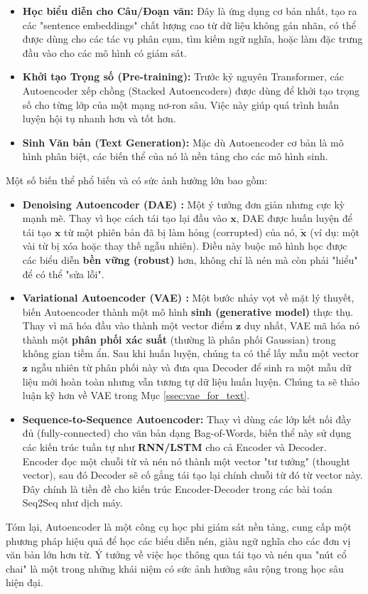\begin{itemize}
    \item \textbf{Học biểu diễn cho Câu/Đoạn văn:} Đây là ứng dụng cơ bản nhất, tạo ra các "sentence embeddings" chất lượng cao từ dữ liệu không gán nhãn, có thể được dùng cho các tác vụ phân cụm, tìm kiếm ngữ nghĩa, hoặc làm đặc trưng đầu vào cho các mô hình có giám sát.
    \item \textbf{Khởi tạo Trọng số (Pre-training):} Trước kỷ nguyên Transformer, các Autoencoder xếp chồng (Stacked Autoencoders) được dùng để khởi tạo trọng số cho từng lớp của một mạng nơ-ron sâu. Việc này giúp quá trình huấn luyện hội tụ nhanh hơn và tốt hơn.
    \item \textbf{Sinh Văn bản (Text Generation):} Mặc dù Autoencoder cơ bản là mô hình phân biệt, các biến thể của nó là nền tảng cho các mô hình sinh.
\end{itemize}

Một số biến thể phổ biến và có sức ảnh hưởng lớn bao gồm:

\begin{itemize}
    \item \textbf{Denoising Autoencoder (DAE) \cite{vincent2008extracting}:} Một ý tưởng đơn giản nhưng cực kỳ mạnh mẽ. Thay vì học cách tái tạo lại đầu vào $\mathbf{x}$, DAE được huấn luyện để tái tạo $\mathbf{x}$ từ một phiên bản đã bị làm hỏng (corrupted) của nó, $\tilde{\mathbf{x}}$ (ví dụ: một vài từ bị xóa hoặc thay thế ngẫu nhiên). Điều này buộc mô hình học được các biểu diễn \textbf{bền vững (robust)} hơn, không chỉ là nén mà còn phải "hiểu" để có thể "sửa lỗi".
    \item \textbf{Variational Autoencoder (VAE) \cite{kingma2013auto}:} Một bước nhảy vọt về mặt lý thuyết, biến Autoencoder thành một mô hình \textbf{sinh (generative model)} thực thụ. Thay vì mã hóa đầu vào thành một vector điểm $\mathbf{z}$ duy nhất, VAE mã hóa nó thành một \textbf{phân phối xác suất} (thường là phân phối Gaussian) trong không gian tiềm ẩn. Sau khi huấn luyện, chúng ta có thể lấy mẫu một vector $\mathbf{z}$ ngẫu nhiên từ phân phối này và đưa qua Decoder để sinh ra một mẫu dữ liệu mới hoàn toàn nhưng vẫn tương tự dữ liệu huấn luyện. Chúng ta sẽ thảo luận kỹ hơn về VAE trong Mục \ref{ssec:vae_for_text}.
    \item \textbf{Sequence-to-Sequence Autoencoder:} Thay vì dùng các lớp kết nối đầy đủ (fully-connected) cho văn bản dạng Bag-of-Words, biến thể này sử dụng các kiến trúc tuần tự như \textbf{RNN/LSTM} cho cả Encoder và Decoder. Encoder đọc một chuỗi từ và nén nó thành một vector "tư tưởng" (thought vector), sau đó Decoder sẽ cố gắng tái tạo lại chính chuỗi từ đó từ vector này. Đây chính là tiền đề cho kiến trúc Encoder-Decoder trong các bài toán Seq2Seq như dịch máy.
\end{itemize}

Tóm lại, Autoencoder là một công cụ học phi giám sát nền tảng, cung cấp một phương pháp hiệu quả để học các biểu diễn nén, giàu ngữ nghĩa cho các đơn vị văn bản lớn hơn từ. Ý tưởng về việc học thông qua tái tạo và nén qua "nút cổ chai" là một trong những khái niệm có sức ảnh hưởng sâu rộng trong học sâu hiện đại.